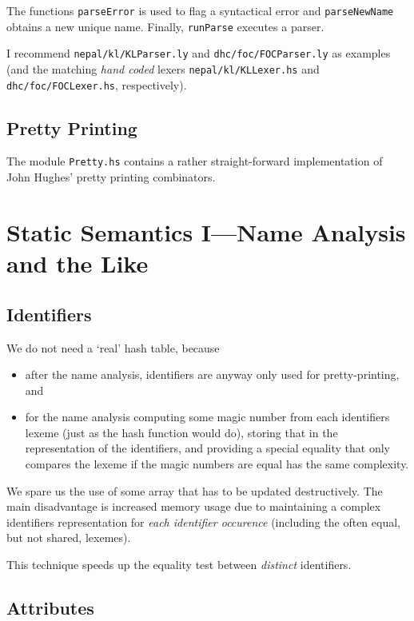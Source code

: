 \documentclass{report}
\newcommand{\code}[1]{\texttt{#1}}
\begin{document}
The functions \code{parseError} is used to flag a syntactical error and
\code{parseNewName} obtains a new unique name.  Finally, \code{runParse}
executes a parser.

I recommend \code{nepal/kl/KLParser.ly} and \code{dhc/foc/FOCParser.ly} as
examples (and the matching \emph{hand coded} lexers \code{nepal/kl/KLLexer.hs}
and \code{dhc/foc/FOCLexer.hs}, respectively).


\section{Pretty Printing}

The module \code{Pretty.hs} contains a rather straight-forward implementation
of John Hughes' pretty printing combinators.


\chapter{Static Semantics I---Name Analysis and the Like}
\label{cha:static1}


\section{Identifiers}
\label{sec:idents}

We do not need a `real' hash table, because
%
\begin{itemize}
\item after the name analysis, identifiers are anyway only used for
  pretty-printing, and
\item for the name analysis computing some magic number from each identifiers
  lexeme (just as the hash function would do), storing that in the
  representation of the identifiers, and providing a special equality that only
  compares the lexeme if the magic numbers are equal has the same complexity.
\end{itemize}
%
We spare us the use of some array that has to be updated destructively. The
main disadvantage is increased memory usage due to maintaining a complex
identifiers representation for {\em each identifier occurence} (including the
often equal, but not shared, lexemes).

This technique speeds up the equality test between \emph{distinct} identifiers.


\section{Attributes}
\label{sec:attrs}
\end{document}
